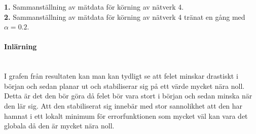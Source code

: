 \documentclass[a4paper,10pt]{article}
\begin{document}
{\bf 1.} Sammanställning av mätdata för körning av nätverk 4.\\
{\bf 2.} Sammanställning av mätdata för körning av nätverk 4 tränat en gång med $\alpha=0.2$.\\
\begin{center}
\end{center}

\paragraph{Inlärning}\hspace{0pt}\\
I grafen från resultaten kan man kan tydligt se att felet minskar drastiskt i början och sedan planar ut och stabiliserar sig på ett värde mycket nära noll. Detta är det den bör göra då felet bör vara stort i början och sedan minska när den lär sig. Att den stabiliserat sig innebär med stor sannolikhet att den har hamnat i ett lokalt minimum för errorfunktionen som mycket väl kan vara det globala då den är mycket nära noll. 
\end{document}
